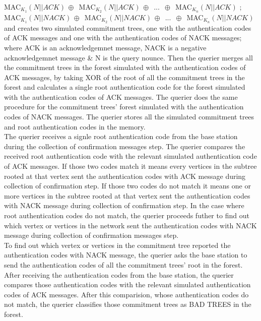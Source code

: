 MAC$_{K_{1}}(N||ACK)\,\oplus\,$ 
MAC$_{K_{2}}(N||ACK)\,\oplus\,$
...
$\,\oplus\,$
MAC$_{K_{n}}(N||ACK)$ ; \\
MAC$_{K_{1}}(N||NACK)\,\oplus\,$ 
MAC$_{K_{2}}(N||NACK)\,\oplus\,$
...
$\,\oplus\,$
MAC$_{K_{n}}(N||NACK)$  \\


and creates two simulated commitment trees, one with the authentication codes of ACK messages and one with the authentication codes of NACK messages; where ACK is an acknowledgemnet message, NACK is a negative acknowledgemnet message \& N is the query nounce. Then the querier merges all the commitment trees in the forest simulated with the authentication codes of ACK messages, by taking XOR of the root of all the commitment trees in the forest and calculates a single root authentication code for the forest simulated with the authentication codes of ACK messages. The querier does the same procedure for the commitment trees' forest simulated with the authentication codes of NACK messages. The querier stores all the simulated commitment trees and root authentication codes in the memory. \\


The querier receives a signle root authentication code from the base station during the collection of confirmation messages step. The querier compares the received root authentication code with the relevant simulated authentication code of ACK messages. If those two codes match it means every vertices in the subtree rooted at that vertex sent the authentication codes with ACK message during collection of confirmation step. If those two codes do not match it means one or more vertices in the subtree rooted at that vertex sent the authentication codes with NACK message during collection of confirmation step. In the case where root authentication codes do not match, the querier proceeds futher to find out which vertex or vertices in the network sent the authentication codes with NACK message during collection of confirmation messages step.\\


To find out which vertex or vertices in the commitment tree reported the authentication codes with NACK message, the querier asks the base station to send the authentication codes of all the commitment trees' root in the forest. After receiving the authentication codes from the base station, the querier compares those authentication codes with the relevant simulated authentication codes of ACK messages. After this comparision, whose authentication codes do not match, the querier classifies those commitment trees as BAD TREES in the forest. \\


